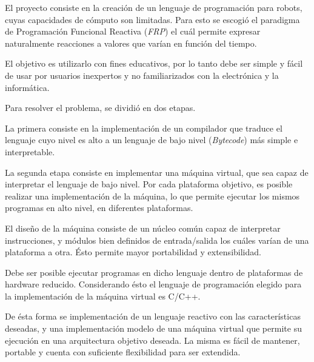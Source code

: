 

El proyecto consiste en la creación de un lenguaje de programación
para robots, cuyas capacidades de cómputo son limitadas.
Para esto se escogió el paradigma de Programación Funcional Reactiva
(\emph{FRP}) el cuál permite expresar naturalmente reacciones a
valores que varían en función del tiempo.

El objetivo es utilizarlo con fines educativos,
por lo tanto debe ser simple y fácil de usar por usuarios
inexpertos y no familiarizados con la electrónica y la informática.

Para resolver el problema, se dividió en dos etapas.

La primera consiste en la implementación de
un compilador que traduce el lenguaje cuyo nivel es alto a
un lenguaje de bajo nivel (\emph{Bytecode}) más simple e interpretable.

La segunda etapa consiste en implementar una máquina virtual, que
sea capaz de interpretar el lenguaje de bajo nivel.
Por cada plataforma objetivo, es posible realizar una implementación de
la máquina, lo que permite ejecutar los mismos
programas en alto nivel, en diferentes plataformas.

El diseño de la máquina consiste de un núcleo común capaz de interpretar
instrucciones, y módulos bien definidos de
entrada/salida los cuáles varían de una plataforma a otra.
Ésto permite mayor portabilidad y extensibilidad.

Debe ser posible ejecutar programas en dicho lenguaje dentro de plataformas
de hardware reducido.
Considerando ésto el lenguaje de programación elegido para la
implementación de la máquina virtual es C/C++.

De ésta forma se implementación de un lenguaje reactivo con las
características deseadas, y una implementación modelo de una máquina
virtual que permite
su ejecución en una arquitectura objetivo deseada.
La misma es fácil de mantener, portable y cuenta con suficiente
flexibilidad para ser extendida.
